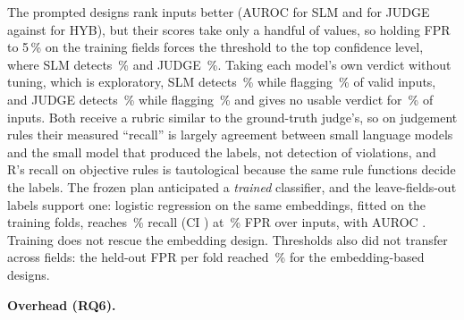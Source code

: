 \documentclass[journal]{IEEEtran}
\begin{document}
The prompted designs rank inputs better (AUROC  for SLM and  for
JUDGE against  for HYB), but their scores take only a handful of values, so holding FPR
to 5\,\% on the training fields forces the threshold to the top confidence level, where SLM detects
\,\% and JUDGE \,\%. Taking each model's own verdict without
tuning, which is exploratory, SLM detects \,\% while flagging \,\% of
valid inputs, and JUDGE detects \,\% while flagging \,\% and
gives no usable verdict for \,\% of inputs. Both receive a rubric similar to the
ground-truth judge's, so on judgement rules their measured ``recall'' is largely agreement between
small language models and the small model that produced the labels, not detection of violations, and
R's recall on objective rules is tautological because the same rule functions decide the labels.
The frozen plan anticipated a \emph{trained} classifier, and the leave-fields-out labels support one:
logistic regression on the same embeddings, fitted on the training folds, reaches
\,\% recall (CI ) at \,\% FPR over
 inputs, with AUROC . Training does not rescue the embedding
design. Thresholds also did not transfer across fields: the held-out FPR per fold reached
\,\% for the embedding-based designs.

\textbf{Overhead (RQ6).} 
\end{document}
